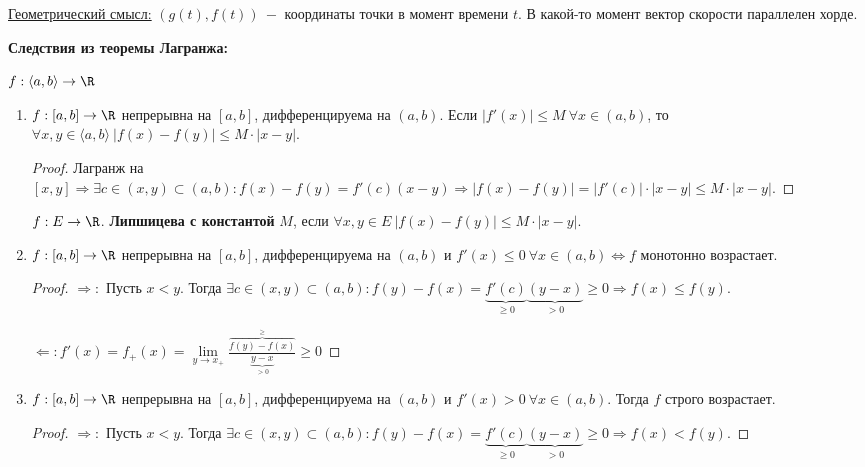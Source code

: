 \begin{remark}
    \underline{Геометрический смысл:} $(g(t), f(t))\ -$ координаты точки в момент времени $t$. В какой-то момент вектор скорости параллелен хорде.
\end{remark}

\begin{corollary}
    \textbf{Следствия из теоремы Лагранжа:}

    $f:\langle a,b \rangle \rightarrow \R$

    \begin{enumerate}
        \item $f:[a,b]\rightarrow \R$ непрерывна на $[a,b]$, дифференцируема на $(a,b)$. Если $|f'(x)|\leq M\ \forall x\in (a,b)$, то $\forall x, y\in \langle a,b \rangle\ |f(x)-f(y)|\leq M\cdot |x-y|$.

        \begin{proof}
            Лагранж на $[x,y]\Rightarrow \exists c\in (x,y)\subset (a,b): f(x)-f(y)=f'(c)(x-y)\Rightarrow |f(x)-f(y)|=|f'(c)|\cdot|x-y|\leq M\cdot |x-y|$.
        \end{proof}

        \begin{definition}
            $f:E\rightarrow \R$. \textbf{Липшицева с константой} $M$, если $\forall x,y\in E\ |f(x)-f(y)|\leq M\cdot |x-y|$.
        \end{definition}

        \item $f:[a,b]\rightarrow \R$ непрерывна на $[a,b]$, дифференцируема на $(a,b)$ и $f'(x)\leq 0\ \forall x\in (a,b)\Leftrightarrow $$f$ монотонно возрастает.

        \begin{proof}
            $\Rightarrow:$ Пусть $x<y$. Тогда $\exists c\in (x,y)\subset (a,b): f(y)-f(x)=\underbrace{f'(c)}_{\geq 0}\underbrace{(y-x)}_{>0}\geq 0\Rightarrow f(x)\leq f(y)$.

            $\Leftarrow: f'(x)=f_+(x)=\lim\limits_{y\rightarrow x_+} \frac{\overbrace{f(y)-f(x)}^{\geq}}{\underbrace{y-x}_{>0}}\geq 0$
        \end{proof}

        \item $f:[a,b]\rightarrow \R$ непрерывна на $[a,b]$, дифференцируема на $(a,b)$ и $f'(x)> 0\ \forall x\in (a,b) $. Тогда $f$ строго возрастает.

        \begin{proof}
            $\Rightarrow:$ Пусть $x<y$. Тогда $\exists c\in (x,y)\subset (a,b): f(y)-f(x)=\underbrace{f'(c)}_{\geq 0}\underbrace{(y-x)}_{>0}\geq 0\Rightarrow f(x)< f(y)$.
        \end{proof}


\end{enumerate}
\end{corollary}
